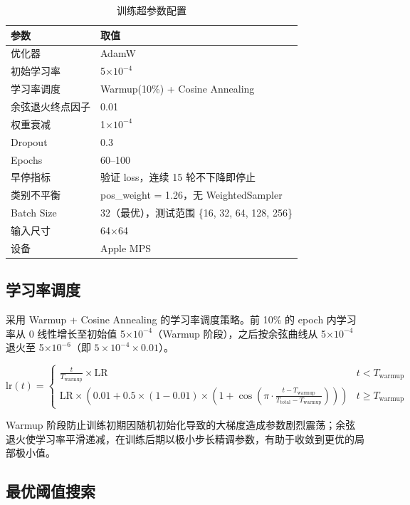 \documentclass[12pt,a4paper]{ctexart}
\begin{document}
\begin{table}[H]
\centering
\caption{训练超参数配置}
\begin{tabular}{ll}
\toprule
参数 & 取值 \\
\midrule
优化器 & AdamW \\
初始学习率 & 5$\times10^{-4}$ \\
学习率调度 & Warmup(10\%) + Cosine Annealing \\
余弦退火终点因子 & 0.01 \\
权重衰减 & 1$\times10^{-4}$ \\
Dropout & 0.3 \\
Epochs & 60--100 \\
早停指标 & 验证 loss，连续 15 轮不下降即停止 \\
类别不平衡 & pos\_weight = 1.26，无 WeightedSampler \\
Batch Size & 32（最优），测试范围 \{16, 32, 64, 128, 256\}\\
输入尺寸 & 64$\times$64 \\
设备 & Apple MPS \\
\bottomrule
\end{tabular}
\end{table}

\subsection{学习率调度}

采用 Warmup + Cosine Annealing 的学习率调度策略。前 10\% 的 epoch 内学习率从 0 线性增长至初始值 5$\times10^{-4}$（Warmup 阶段），之后按余弦曲线从 5$\times10^{-4}$ 退火至 5$\times10^{-6}$（即 $5\times10^{-4} \times 0.01$）。

\[
\text{lr}(t) = \begin{cases}
\displaystyle\frac{t}{T_{\text{warmup}}} \times \text{LR} & t < T_{\text{warmup}} \\[8pt]
\text{LR} \times \left(0.01 + 0.5 \times (1 - 0.01) \times \left(1 + \cos\left(\pi \cdot \frac{t - T_{\text{warmup}}}{T_{\text{total}} - T_{\text{warmup}}}\right)\right)\right) & t \geq T_{\text{warmup}}
\end{cases}
\]

Warmup 阶段防止训练初期因随机初始化导致的大梯度造成参数剧烈震荡；余弦退火使学习率平滑递减，在训练后期以极小步长精调参数，有助于收敛到更优的局部极小值。

\subsection{最优阈值搜索}
\end{document}
